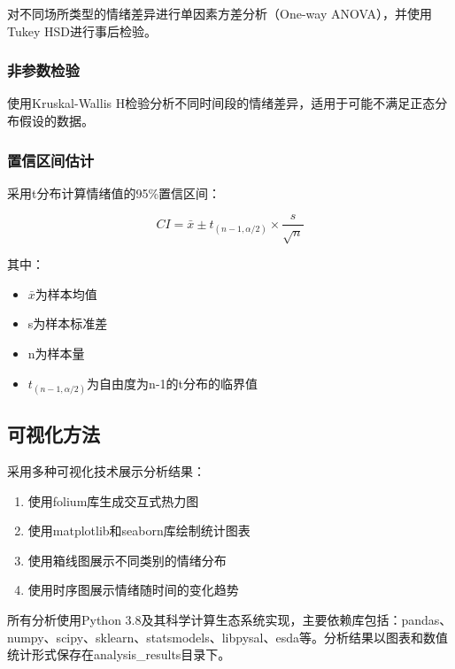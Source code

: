 \documentclass[12pt,a4paper]{article}
\begin{document}
对不同场所类型的情绪差异进行单因素方差分析（One-way ANOVA），并使用Tukey HSD进行事后检验。

\subsubsection{非参数检验}

使用Kruskal-Wallis H检验分析不同时间段的情绪差异，适用于可能不满足正态分布假设的数据。

\subsubsection{置信区间估计}

采用t分布计算情绪值的95\%置信区间：

\begin{equation}
CI = \bar{x} \pm t_{(n-1, \alpha/2)} \times \frac{s}{\sqrt{n}}
\end{equation}

其中：
\begin{itemize}
\item $\bar{x}$为样本均值
\item s为样本标准差
\item n为样本量
\item $t_{(n-1, \alpha/2)}$为自由度为n-1的t分布的临界值
\end{itemize}

\subsection{可视化方法}

采用多种可视化技术展示分析结果：
\begin{enumerate}
\item 使用folium库生成交互式热力图
\item 使用matplotlib和seaborn库绘制统计图表
\item 使用箱线图展示不同类别的情绪分布
\item 使用时序图展示情绪随时间的变化趋势
\end{enumerate}

所有分析使用Python 3.8及其科学计算生态系统实现，主要依赖库包括：pandas、numpy、scipy、sklearn、statsmodels、libpysal、esda等。分析结果以图表和数值统计形式保存在analysis\_results目录下。
\end{document}
